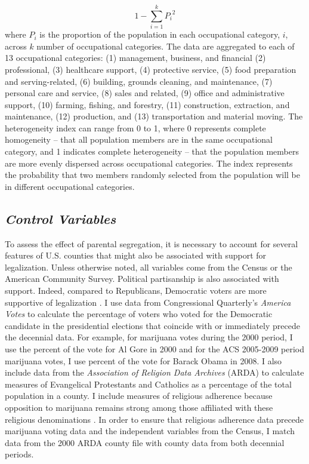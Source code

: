 \begin{equation}
1 - \sum_{i = 1}^{k}{P_{i}}^2
\end{equation}
where $P_{i}$ is the proportion of the population in each occupational category, $i$, across $k$ number of occupational categories. The data are aggregated to each of 13 occupational categories: (1) management, business, and financial (2) professional, (3) healthcare support, (4) protective service, (5) food preparation and serving-related, (6) building, grounds cleaning, and maintenance, (7) personal care and service, (8) sales and related, (9) office and administrative support, (10) farming, fishing, and forestry, (11) construction, extraction, and maintenance, (12) production, and (13) transportation and material moving. The heterogeneity index can range from 0 to 1, where 0 represents complete homogeneity -- that all population members are in the same occupational category, and 1 indicates complete heterogeneity -- that the population members are more evenly dispersed across occupational categories. The index represents the probability that two members randomly selected from the population will be in different occupational categories.


\subsection{\it{Control Variables}}

To assess the effect of parental segregation, it is necessary to account for several features of U.S. counties that might also be associated with support for legalization. Unless otherwise noted, all variables come from the Census or the American Community Survey. Political partisanship is also associated with support. Indeed, compared to Republicans, Democratic voters are more supportive of legalization \citep{rosenthal_and_kubby_1996,caulkins_et_al_2012}. I use data from Congressional Quarterly's {\it{America Votes}} to calculate the percentage of voters who voted for the Democratic candidate in the presidential elections that coincide with or immediately precede the decennial data. For example, for marijuana votes during the 2000 period, I use the percent of the vote for Al Gore in 2000 and for the ACS 2005-2009 period marijuana votes, I use percent of the vote for Barack Obama in 2008. 
I also include data from the {\it{Association of Religion Data Archives}} (ARDA) to calculate measures of Evangelical Protestants and Catholics as a percentage of the total population in a county. I include measures of religious adherence because opposition to marijuana remains strong among those affiliated with these religious denominations \citep{caulkins_et_al_2012,palamar_2014}. In order to ensure that religious adherence data precede marijuana voting data and the independent variables from the Census, I match data from the 2000 ARDA county file with county data from both decennial periods. 

